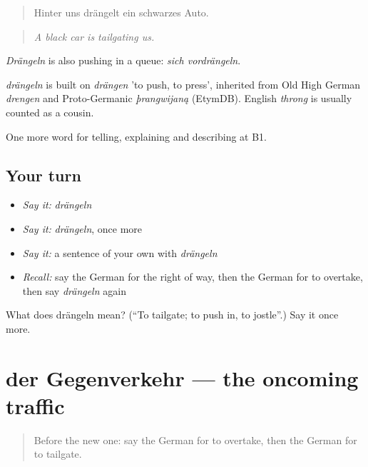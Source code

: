 \begin{quote}
Hinter uns drängelt ein schwarzes Auto.
\end{quote}

\begin{quote}
\emph{A black car is tailgating us.}
\end{quote}

\emph{Drängeln} is also pushing in a queue: \emph{sich vordrängeln}.

\begin{cousinweb}
\emph{drängeln} is built on \emph{drängen} 'to push, to press', inherited from Old High German \emph{drengen} and Proto-Germanic \emph{þrangwijaną} (EtymDB). English \emph{throng} is usually counted as a cousin.
\end{cousinweb}

\begin{grammarlens}[title={What you've built}]
One more word for telling, explaining and describing at B1.
\end{grammarlens}

\subsection*{Your turn}
\begin{itemize}
\raggedright
  \item \emph{Say it:} \emph{drängeln}
  \item \emph{Say it:} \emph{drängeln}, once more
  \item \emph{Say it:} a sentence of your own with \emph{drängeln}
  \item \emph{Recall:} say the German for the right of way, then the German for to overtake, then say \emph{drängeln} again
\end{itemize}

\begin{tcolorbox}[breakable,colback=teal!4,colframe=teal!35!black,title={Before you move on}]
What does drängeln mean? (\textquotedblleft{}To tailgate; to push in, to jostle\textquotedblright{}.) Say it once more.
\end{tcolorbox}
\section[der Gegenverkehr]{der Gegenverkehr — the oncoming traffic}

\label{lesson:GE-C408-gegenverkehr}



\begin{quote}
Before the new one: say the German for to overtake, then the German for to tailgate.
\end{quote}

